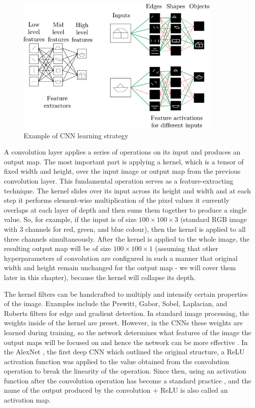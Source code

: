 \begin{figure}[H]
\begin{centering}
\includegraphics[width=10cm]{assets/images/cnn.jpg}
\par\end{centering}
\caption{Example of CNN learning strategy \cite{Santosh2022-2}}
\label{fig:cnn}
\end{figure}

A convolution layer applies a series of operations on its input and produces an output map. The most important part is applying a kernel, which is a tensor of fixed width and height, over the input image or output map from the previous convolution layer. This fundamental operation serves as a feature-extracting technique. The kernel slides over its input across its height and width and at each step it performs element-wise multiplication of the pixel values it currently overlaps at each layer of depth and then sums them together to produce a single value. So, for example, if the input is of size $100\times100\times3$ (standard RGB image with 3 channels for red, green, and blue colour), then the kernel is applied to all three channels simultaneously. After the kernel is applied to the whole image, the resulting output map will be of size $100\times100\times1$ (assuming that other hyperparameters of convolution are configured in such a manner that original width and height remain unchanged for the output map - we will cover them later in this chapter), because the kernel will collapse its depth. 

The kernel filters can be handcrafted to multiply and intensify certain properties of the image. Examples include the Prewitt, Gabor, Sobel, Laplacian, and Roberts filters for edge and gradient detection. In standard image processing, the weights inside of the kernel are preset. However, in the CNNs these weights are learned during training, so the network determines what features of the image the output maps will be focused on and hence the network can be more effective \cite{Santosh2022-2, He2023}. In the AlexNet \cite{Krizhevsky2012}, the first deep CNN which outlined the original structure, a ReLU activation function was applied to the value obtained from the convolution operation to break the linearity of the operation. Since then, using an activation function after the convolution operation has become a standard practice \cite{Santosh2022-2, He2023}, and the name of the output produced by the convolution + ReLU is also called an activation map.

